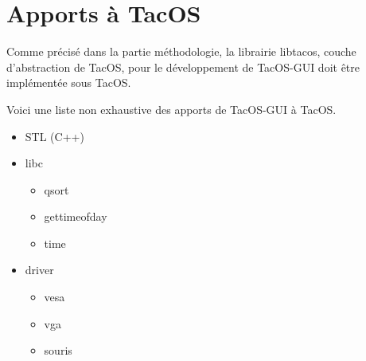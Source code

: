 \section{Apports à TacOS}

Comme précisé dans la partie méthodologie, la librairie libtacos, couche d'abstraction de TacOS, pour le développement de TacOS-GUI doit être implémentée sous TacOS.

Voici une liste non exhaustive des apports de TacOS-GUI à TacOS.
  
\begin{itemize}
  \item STL (C++)
  \item libc
    \begin{itemize}
      \item qsort
      \item gettimeofday
      \item time
    \end{itemize}
  \item driver
    \begin{itemize}
      \item vesa
      \item vga
      \item souris
    \end{itemize}
\end{itemize}

